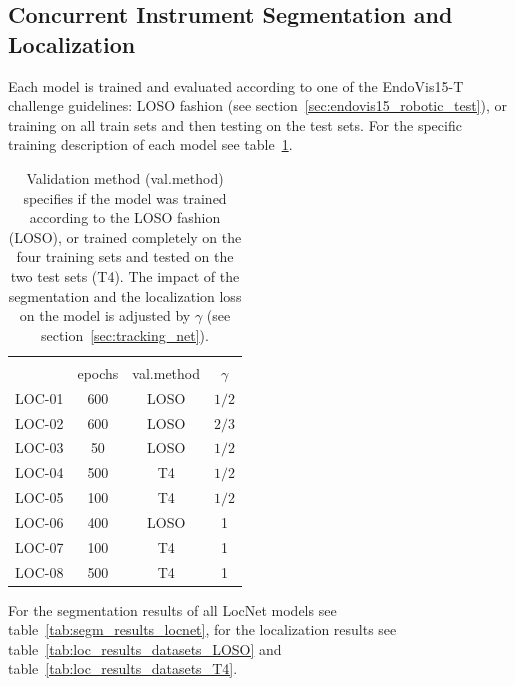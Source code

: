 \subsection{Concurrent Instrument Segmentation and Localization}
Each model is trained and evaluated according to one of the EndoVis15-T challenge guidelines: LOSO fashion (see section~\ref{sec:endovis15_robotic_test}), or training on all train sets and then testing on the test sets. 
For the specific training description of each model see table~\ref{tab:training_descr_locnet}.

\begin{table}
\centering
 \begin{tabular}{l c c c } 
 \hline\noalign{\smallskip}
 \multicolumn{4}{c}{\textbf{Training Conditions LocNet}} \\
	& epochs & val.method & $\gamma$  \\ [0.5ex]
 \hline \noalign{\smallskip}
 LOC-01 & 600 & LOSO & $1/2$ \\ 
 LOC-02 & 600 & LOSO & $2/3$ \\ 
 LOC-03 & 50 & LOSO & $1/2$ \\ 
 LOC-04 & 500 & T4 & $1/2$ \\
 LOC-05 & 100 & T4 & $1/2$ \\
 LOC-06 & 400 & LOSO & 1 \\
 LOC-07 & 100 & T4 & 1 \\ 
 LOC-08 & 500 & T4 & 1 \\ [0.5ex]
 \hline 
 \end{tabular}  
\caption[LocNet training conditions]{Validation method (val.method) specifies if the model was trained according to the LOSO fashion (LOSO), or trained completely on the four training sets and tested on the two test sets (T4). The impact of the segmentation and the localization loss on the model is adjusted by $\gamma$ (see section~\ref{sec:tracking_net}).}
\label{tab:training_descr_locnet}
\end{table}

For the segmentation results of all LocNet models see table~\ref{tab:segm_results_locnet}, for the localization results see table~\ref{tab:loc_results_datasets_LOSO} and table~\ref{tab:loc_results_datasets_T4}.

